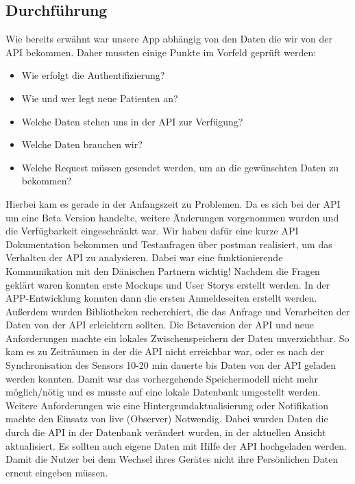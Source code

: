 \subsection{Durchführung}\label{durchführung}
Wie bereits erwähnt war unsere App abhängig von den Daten die wir von der API bekommen. Daher mussten einige Punkte im Vorfeld geprüft werden:
\begin{itemize}\label{stichpunkte}
	\item Wie erfolgt die Authentifizierung?
	\item Wie und wer legt neue Patienten an?
	\item Welche Daten stehen uns in der API zur Verfügung?
	\item Welche Daten brauchen wir?
	\item Welche Request müssen gesendet werden, um an die gewünschten Daten zu bekommen?
\end{itemize}
Hierbei kam es gerade in der Anfangszeit zu Problemen. Da es sich bei der API um eine Beta Version handelte, weitere Änderungen vorgenommen wurden und die Verfügbarkeit eingeschränkt war.
Wir haben dafür eine kurze API Dokumentation bekommen und Testanfragen über \gls{postman} realisiert, um das Verhalten der API zu analysieren. Dabei war eine funktionierende Kommunikation mit den Dänischen Partnern wichtig! 
Nachdem die Fragen geklärt waren konnten erste Mockups und User Storys erstellt werden. In der APP-Entwicklung konnten dann die ersten Anmeldeseiten erstellt werden. Außerdem wurden Bibliotheken recherchiert, die das Anfrage und Verarbeiten der Daten von der API erleichtern sollten.
Die Betaversion der  API und neue Anforderungen machte ein lokales Zwischenspeichern der Daten unverzichtbar. So kam es zu Zeiträumen in der die API nicht erreichbar war, oder  es nach der Synchronisation des Sensors 10-20 min dauerte bis  Daten von der API geladen werden konnten.
Damit war das vorhergehende Speichermodell nicht mehr möglich/nötig und es musste auf eine lokale Datenbank umgestellt werden. Weitere Anforderungen wie eine
 Hintergrundaktualisierung oder Notifikation machte den Einsatz von \gls{live}  (Observer) Notwendig. Dabei wurden  Daten die durch die API in der Datenbank verändert wurden,  in der aktuellen Ansicht aktualisiert. Es sollten auch eigene Daten mit Hilfe der API hochgeladen werden. Damit die Nutzer bei dem Wechsel ihres Gerätes nicht  ihre Persönlichen Daten erneut eingeben müssen.
